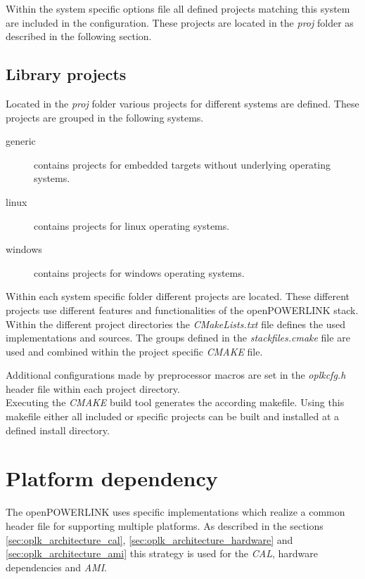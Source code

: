 Within the system specific options file all defined projects matching this system are included in the configuration.
These projects are located in the \emph{proj} folder as described in the following section.

\subsection{Library projects}
\label{sec:oplk_structure_proj}
Located in the \emph{proj} folder various projects for different systems are defined.
These projects are grouped in the following systems.

\begin{description}
    \item[generic] contains projects for embedded targets without underlying operating systems.
    \item[linux] contains projects for linux operating systems.
    \item[windows] contains projects for windows operating systems.
\end{description}

Within each system specific folder different projects are located.
These different projects use different features and functionalities of the openPOWERLINK stack.
Within the different project directories the \emph{CMakeLists.txt} file defines the used implementations and sources.
The groups defined in the \emph{stackfiles.cmake} file are used and combined within the project specific \emph{CMAKE} file.

Additional configurations made by preprocessor macros are set in the \emph{oplkcfg.h} header file within each project directory.
\\

Executing the \emph{CMAKE} build tool generates the according makefile.
Using this makefile either all included or specific projects can be built and installed at a defined install directory. \cite[Building Stack Libraries]{openpowerlink_doc}

\section{Platform dependency}
\label{sec:oplk_platform}

The openPOWERLINK uses specific implementations which realize a common header file for supporting multiple platforms.
As described in the sections \ref{sec:oplk_architecture_cal}, \ref{sec:oplk_architecture_hardware} and \ref{sec:oplk_architecture_ami} this strategy is used for the \emph{CAL}, hardware dependencies and \emph{AMI}.

